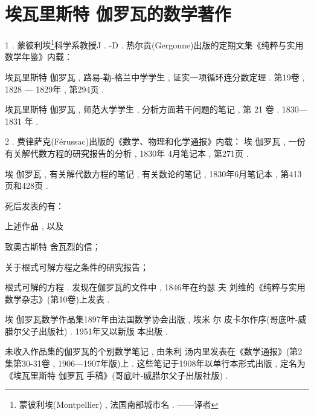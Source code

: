 \section{埃瓦里斯特 \textbullet 伽罗瓦的数学著作}

1 . 蒙彼利埃\footnote{蒙彼利埃(Montpellier) , 法国南部城市名 . ——译者}科学系教授J . -D . 热尔贡(Gergonne)出版的定期文集《纯粹与实用数学年鉴》内载：

埃瓦里斯特 \textbullet 伽罗瓦 , 路易-勒-格兰中学学生 , 证实一项循环连分数定理 . 第19卷 , 1828 — 1829年 , 第294页 . 

埃瓦里斯特 \textbullet 伽罗瓦 , 师范大学学生 , 分析方面若干问题的笔记 , 第 21 卷 . 1830—1831 年 . 

2 . 费律萨克(Férussac)出版的《数学、物理和化学通报》内载：
埃 \textbullet 伽罗瓦 , 一份有关解代数方程的研究报告的分析 , 1830年 4月笔记本 , 第271页 . 

埃 \textbullet 伽罗瓦 , 有关解代数方程的笔记 , 有关数论的笔记 , 1830年6月笔记本 , 第413页和428页 . 

死后发表的有：

上述作品 , 以及

致奥古斯特 \textbullet 舍瓦烈的信；

关于根式可解方程之条件的研究报告；

根式可解的方程 . 发现在伽罗瓦的文件中 , 1846年在约瑟 夫 \textbullet 刘维的《纯粹与实用数学杂志》(第10卷)上发表 . 

埃 \textbullet 伽罗瓦数学作品集1897年由法国数学协会出版 , 埃米 尔 \textbullet 皮卡尔作序(哥底叶-威腊尔父子出版社) . 1951年又以新版 本出版 . 

未收入作品集的伽罗瓦的个别数学笔记 , 由朱利 \textbullet 汤内里发表在《数学通报》(第2集第30-31卷 , 1906—1907年版)上 . 这些笔记于1908年以单行本形式出版 , 定名为《埃瓦里斯特 \textbullet 伽罗瓦 手稿》(哥底叶-威腊尔父子出版社版) . 

